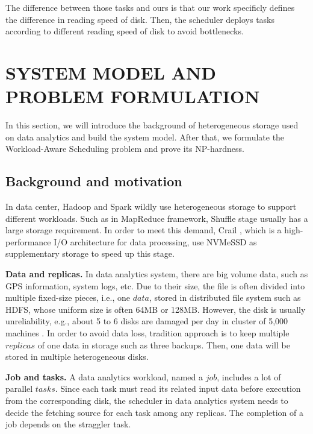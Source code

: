 \documentclass[conference]{IEEEtran}
\begin{document}
The difference between those tasks and ours is that our work specificly defines the difference in reading speed of disk. Then, the scheduler deploys tasks according to different reading speed of disk to avoid bottlenecks.

\section{SYSTEM MODEL AND PROBLEM FORMULATION}\label{SYSTEM_MODEL}
In this section, we will introduce the background of heterogeneous storage used on data analytics and build the system model. After that, we formulate the Workload-Aware Scheduling problem and prove its NP-hardness. 

\subsection{Background and motivation}\label{AA}

In data center, Hadoop and Spark wildly use heterogeneous storage to support different workloads. Such as in MapReduce framework, Shuffle stage usually has a large storage requirement. In order to meet this demand, Crail \cite{b37}, which is a high-performance I/O architecture for data processing, use NVMeSSD as supplementary storage to speed up this stage.

\textbf{Data and replicas.} In data analytics system, there are big volume data, such as GPS information\cite{b38}, system logs\cite{b39}, etc. Due to their size, the file is often divided into multiple fixed-size pieces, i.e., one $data$, stored in distributed file system such as HDFS\cite{b19}, whose uniform size is often 64MB or 128MB. However, the disk is usually unreliability, e.g., about 5 to 6 disks are damaged per day in cluster of 5,000 machines \cite{b32}. In order to avoid data loss, tradition approach is to keep multiple $replicas$ of one data in storage such as three backups. Then, one data will be stored in multiple heterogeneous disks.

\textbf{Job and tasks.} A data analytics workload, named a $job$, includes a lot of parallel $tasks$. Since each task must read its related input data before execution from the corresponding disk, the scheduler in data analytics system needs to decide the fetching source for each task among any replicas. The completion of a job depends on the straggler task.
\end{document}
